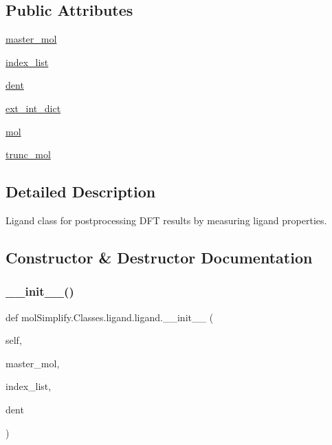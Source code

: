 \subsection*{Public Attributes}
\begin{DoxyCompactItemize}
\item 
\hyperlink{classmolSimplify_1_1Classes_1_1ligand_1_1ligand_a4789951476ce69aa2b606b97ac535f41}{master\+\_\+mol}
\item 
\hyperlink{classmolSimplify_1_1Classes_1_1ligand_1_1ligand_ab9dfcb555aa0d747bf5e824c70149684}{index\+\_\+list}
\item 
\hyperlink{classmolSimplify_1_1Classes_1_1ligand_1_1ligand_aba886d417452a3657a9c6d5e091af3d1}{dent}
\item 
\hyperlink{classmolSimplify_1_1Classes_1_1ligand_1_1ligand_a09ffd49db7deee15e5c2a47fba17d50b}{ext\+\_\+int\+\_\+dict}
\item 
\hyperlink{classmolSimplify_1_1Classes_1_1ligand_1_1ligand_ad43e7d608bcb256aa79d4b54755070b5}{mol}
\item 
\hyperlink{classmolSimplify_1_1Classes_1_1ligand_1_1ligand_a1ffdc17b9247581d021fa83aee591e96}{trunc\+\_\+mol}
\end{DoxyCompactItemize}


\subsection{Detailed Description}
Ligand class for postprocessing D\+FT results by measuring ligand properties. 

\subsection{Constructor \& Destructor Documentation}
\mbox{\label{classmolSimplify_1_1Classes_1_1ligand_1_1ligand_ab9c068d82f0bb9b6494a734558930984}} 
\subsubsection{\texorpdfstring{\+\_\+\+\_\+init\+\_\+\+\_\+()}{\_\_init\_\_()}}
{\footnotesize\ttfamily def mol\+Simplify.\+Classes.\+ligand.\+ligand.\+\_\+\+\_\+init\+\_\+\+\_\+ (\begin{DoxyParamCaption}\item[{}]{self,  }\item[{}]{master\+\_\+mol,  }\item[{}]{index\+\_\+list,  }\item[{}]{dent }\end{DoxyParamCaption})}



